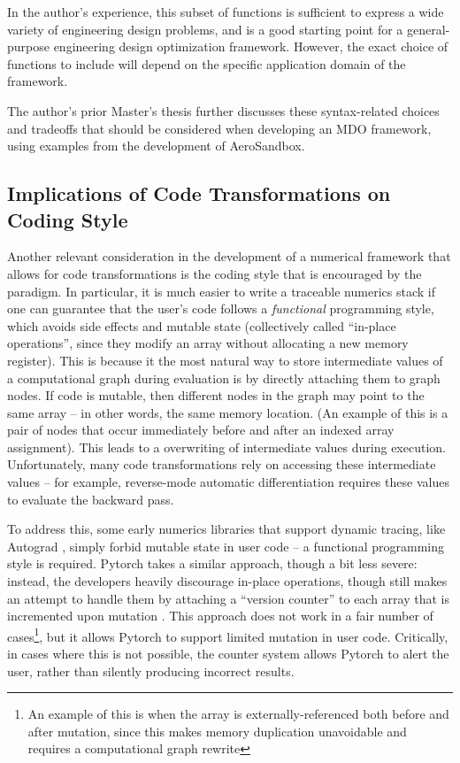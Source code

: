 In the author's experience, this subset of functions is sufficient to express a wide variety of engineering design problems, and is a good starting point for a general-purpose engineering design optimization framework. However, the exact choice of functions to include will depend on the specific application domain of the framework.

The author's prior Master's thesis \cite{sharpe_aerosandbox_2021} further discusses these syntax-related choices and tradeoffs that should be considered when developing an MDO framework, using examples from the development of AeroSandbox.

\subsection{Implications of Code Transformations on Coding Style}
\label{sec:code_style}

Another relevant consideration in the development of a numerical framework that allows for code transformations is the coding style that is encouraged by the paradigm. In particular, it is much easier to write a traceable numerics stack if one can guarantee that the user's code follows a \emph{functional} programming style, which avoids side effects and mutable state (collectively called ``in-place operations'', since they modify an array without allocating a new memory register). This is because it the most natural way to store intermediate values of a computational graph during evaluation is by directly attaching them to graph nodes. If code is mutable, then different nodes in the graph may point to the same array -- in other words, the same memory location. (An example of this is a pair of nodes that occur immediately before and after an indexed array assignment). This leads to a overwriting of intermediate values during execution. Unfortunately, many code transformations rely on accessing these intermediate values -- for example, reverse-mode automatic differentiation requires these values to evaluate the backward pass.

To address this, some early numerics libraries that support dynamic tracing, like Autograd \cite{maclaurin_autograd_2015, maclaurin_modeling_2016}, simply forbid mutable state in user code -- a functional programming style is required. Pytorch takes a similar approach, though a bit less severe: instead, the developers heavily discourage in-place operations, though still makes an attempt to handle them by attaching a ``version counter'' to each array that is incremented upon mutation \cite{paszke_pytorch_2019}. This approach does not work in a fair number of cases\footnote{An example of this is when the array is externally-referenced both before and after mutation, since this makes memory duplication unavoidable and requires a computational graph rewrite}, but it allows Pytorch to support limited mutation in user code. Critically, in cases where this is not possible, the counter system allows Pytorch to alert the user, rather than silently producing incorrect results.

